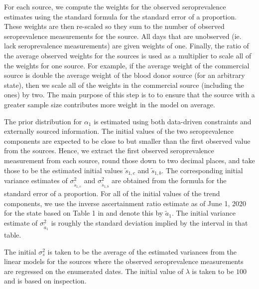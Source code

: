 \documentclass{article}
\begin{document}
For each source, we compute the weights for the observed seroprevalence
estimates using the standard formula for the standard error of a proportion.
These weights are then re-scaled so they sum to the number of observed
seroprevalence measurements for the source. All days that are unobserved (ie.
lack seroprevalence measurements) are given weights of one. Finally, the ratio
of the average observed weights for the sources is used as a multiplier to scale
all of the weights for one source. For example, if the average weight of the
commercial source is double the average weight of the blood donor source (for an
arbitrary state), then we scale all of the weights in the commercial source
(including the ones) by two. The main purpose of this step is to to ensure that
the source with a greater sample size contributes more weight in the model on
average. %

The prior distribution for $\alpha_1$ is estimated using both data-driven constraints 
and externally sourced information. The initial values of the two seroprevalence 
components are expected to be close to
but smaller than the first observed value from the sources. Hence, we
extract the first observed seroprevalence measurement from each source, round
those down to two decimal places, and take those to be the estimated initial
values $\tilde{s}_{1,c}$ and $\tilde{s}_{1,b}$. The corresponding initial
variance estimates of $\sigma^2_{\tilde{s}_{1,c}}$ and
$\sigma^2_{\tilde{s}_{1,b}}$ are obtained from the formula for the standard
error of a proportion. For all of the initial values of the trend components, we
use the inverse ascertainment ratio estimate as of June 1, 2020 for the state
based on Table 1 in \citet{unwin2020state} and denote this by $\tilde{a}_1$. The
initial variance estimate of $\sigma^2_{\tilde{a}_1}$ is roughly the standard
deviation implied by the interval in that table.  %

The initial $\sigma^2_s$ is taken to be the average of the estimated variances
from the linear models for the sources where the observed seroprevalence
measurements are regressed on the enumerated dates. The initial value of
$\lambda$ is taken to be $100$ and is based on inspection.  
\end{document}
